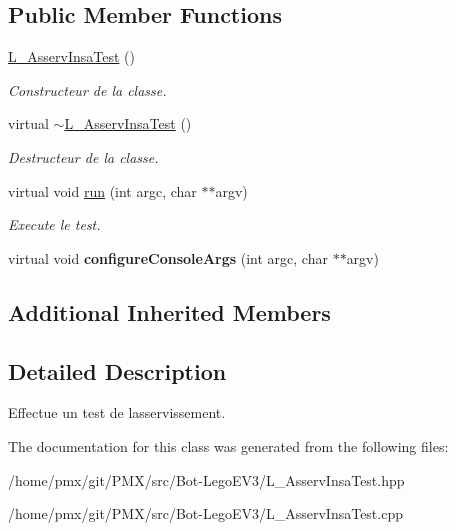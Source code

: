 \subsection*{Public Member Functions}
\begin{DoxyCompactItemize}
\item 
\mbox{\label{classL__AsservInsaTest_a15503d08ef7670f374a36acbc51b9f79}} 
\hyperlink{classL__AsservInsaTest_a15503d08ef7670f374a36acbc51b9f79}{L\+\_\+\+Asserv\+Insa\+Test} ()
\begin{DoxyCompactList}\small\item\em Constructeur de la classe. \end{DoxyCompactList}\item 
\mbox{\label{classL__AsservInsaTest_a5e666c152c5f1ee27f04df975d2ac0f8}} 
virtual \hyperlink{classL__AsservInsaTest_a5e666c152c5f1ee27f04df975d2ac0f8}{$\sim$\+L\+\_\+\+Asserv\+Insa\+Test} ()
\begin{DoxyCompactList}\small\item\em Destructeur de la classe. \end{DoxyCompactList}\item 
\mbox{\label{classL__AsservInsaTest_a17f23a7e7f4bba61e098e1aecdd643f2}} 
virtual void \hyperlink{classL__AsservInsaTest_a17f23a7e7f4bba61e098e1aecdd643f2}{run} (int argc, char $\ast$$\ast$argv)
\begin{DoxyCompactList}\small\item\em Execute le test. \end{DoxyCompactList}\item 
\mbox{\label{classL__AsservInsaTest_ab884ad3a2a14530dc510544e853eb908}} 
virtual void {\bfseries configure\+Console\+Args} (int argc, char $\ast$$\ast$argv)
\end{DoxyCompactItemize}
\subsection*{Additional Inherited Members}


\subsection{Detailed Description}
Effectue un test de l\textquotesingle{}asservissement. 

The documentation for this class was generated from the following files\+:\begin{DoxyCompactItemize}
\item 
/home/pmx/git/\+P\+M\+X/src/\+Bot-\/\+Lego\+E\+V3/L\+\_\+\+Asserv\+Insa\+Test.\+hpp\item 
/home/pmx/git/\+P\+M\+X/src/\+Bot-\/\+Lego\+E\+V3/L\+\_\+\+Asserv\+Insa\+Test.\+cpp\end{DoxyCompactItemize}
